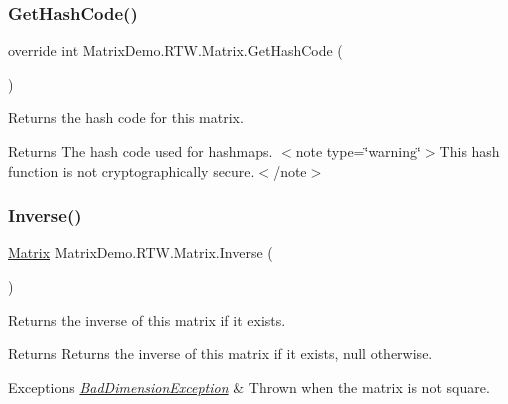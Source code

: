 \subsubsection{\texorpdfstring{Get\+Hash\+Code()}{GetHashCode()}}
{\footnotesize\ttfamily override int Matrix\+Demo.\+R\+T\+W.\+Matrix.\+Get\+Hash\+Code (\begin{DoxyParamCaption}{ }\end{DoxyParamCaption})}



Returns the hash code for this matrix. 

\begin{DoxyReturn}{Returns}
The hash code used for hashmaps. $<$note type=\char`\"{}warning\char`\"{}$>$This hash function is not cryptographically secure.$<$/note$>$
\end{DoxyReturn}
\mbox{\label{class_matrix_demo_1_1_r_t_w_1_1_matrix_a6d733a0dfeef17bf64c99671bc4cb116}} 
\subsubsection{\texorpdfstring{Inverse()}{Inverse()}}
{\footnotesize\ttfamily \mbox{\hyperlink{class_matrix_demo_1_1_r_t_w_1_1_matrix}{Matrix}} Matrix\+Demo.\+R\+T\+W.\+Matrix.\+Inverse (\begin{DoxyParamCaption}{ }\end{DoxyParamCaption})}



Returns the inverse of this matrix if it exists. 

\begin{DoxyReturn}{Returns}
Returns the inverse of this matrix if it exists, null otherwise.
\end{DoxyReturn}

\begin{DoxyExceptions}{Exceptions}
{\em \mbox{\hyperlink{class_matrix_demo_1_1_r_t_w_1_1_bad_dimension_exception}{Bad\+Dimension\+Exception}}} & Thrown when the matrix is not square.\\
\hline
\end{DoxyExceptions}
\mbox{\label{class_matrix_demo_1_1_r_t_w_1_1_matrix_ac23641ac04b3c3baf14174bdf9049db2}} 

